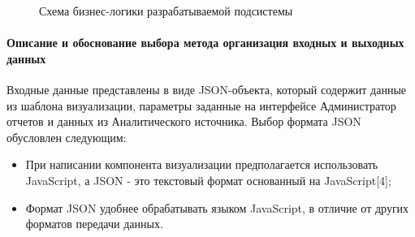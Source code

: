 \documentclass[a4paper]{extarticle}
\numberwithin{equation}{section}
\begin{document}
\begin{figure}[H]
\centering
\caption{Схема бизнес-логики разрабатываемой подсистемы}
\label{ris2}
\end{figure}\par

\paragraph{Описание и обоснование выбора метода организация входных и выходных данных}
Входные данные представлены в виде JSON-объекта, который содержит данные из шаблона визуализации, параметры заданные на интерфейсе Администратор отчетов и данных из Аналитического источника. Выбор формата JSON обусловлен следующим:
\begin{itemize}
\item При написании компонента визуализации предполагается использовать JavaScript, а JSON - это текстовый формат основанный на JavaScript[4];
\item Формат JSON удобнее обрабатывать языком JavaScript, в отличие от других форматов передачи данных.
\end{itemize}
\end{document}
